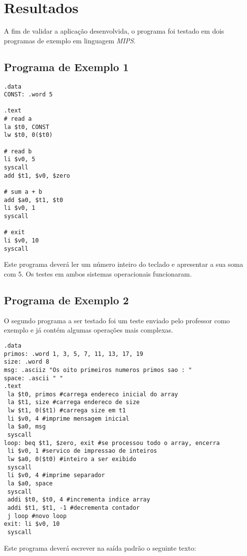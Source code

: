 \documentclass[12pt, a4paper, twoside]{article}
\begin{document}
\section{Resultados}

A fim de validar a aplicação desenvolvida, o programa foi testado em dois
programas de exemplo em linguagem \textit{MIPS}.

\subsection{Programa de Exemplo 1}

\begin{lstlisting}[caption=Primeiro teste]
.data
CONST: .word 5

.text
# read a
la $t0, CONST
lw $t0, 0($t0)

# read b
li $v0, 5
syscall
add $t1, $v0, $zero

# sum a + b
add $a0, $t1, $t0
li $v0, 1
syscall

# exit
li $v0, 10
syscall
\end{lstlisting}

Este programa deverá ler um número inteiro do teclado e apresentar a sua soma
com 5. Os testes em ambos sistemas operacionais funcionaram.

\subsection{Programa de Exemplo 2}

O segundo programa a ser testado foi um teste enviado pelo professor como
exemplo e já contém algumas operações mais complexas.

\begin{lstlisting}[caption=Segundo teste]
.data
primos: .word 1, 3, 5, 7, 11, 13, 17, 19
size: .word 8
msg: .asciiz "Os oito primeiros numeros primos sao : "
space: .ascii " "
.text
 la $t0, primos #carrega endereco inicial do array
 la $t1, size #carrega endereco de size
 lw $t1, 0($t1) #carrega size em t1
 li $v0, 4 #imprime mensagem inicial
 la $a0, msg
 syscall
loop: beq $t1, $zero, exit #se processou todo o array, encerra
 li $v0, 1 #servico de impressao de inteiros
 lw $a0, 0($t0) #inteiro a ser exibido
 syscall
 li $v0, 4 #imprime separador
 la $a0, space
 syscall
 addi $t0, $t0, 4 #incrementa indice array
 addi $t1, $t1, -1 #decrementa contador
 j loop #novo loop
exit: li $v0, 10
 syscall
\end{lstlisting}

Este programa deverá escrever na saída padrão o seguinte texto:
\end{document}
